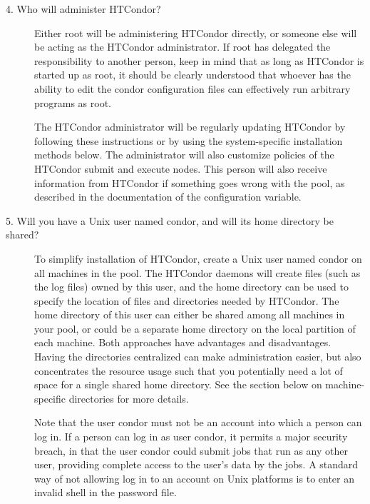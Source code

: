 \begin{description}
\item[4. Who will administer HTCondor?]



Either root will be administering HTCondor directly, or someone else
will be acting as the HTCondor administrator.  If root has delegated
the responsibility to another person, keep in mind that as long as
HTCondor is started up as root, it should be clearly understood that
whoever has the ability to edit the condor configuration files can
effectively run arbitrary programs as root.

The HTCondor administrator will be regularly updating HTCondor by following
these instructions or by using the system-specific installation methods below.
The administrator
will also customize policies of the HTCondor submit and execute nodes.
This person will also receive information from HTCondor if 
something goes wrong with the pool, 
as described in the documentation of the 
configuration variable.

\item[5. Will you have a Unix user named condor, and will its home
directory be shared?]

To simplify installation of HTCondor,
create a Unix user named condor on all machines in the pool.
The HTCondor daemons will create files
(such as the log files) owned by this user,
and the home directory can be used to specify the location of files
and directories needed by HTCondor.  The home directory of this user can
either be shared among all machines in your pool, or could be a
separate home directory on the local partition of each machine.  Both
approaches have advantages and disadvantages.  Having the directories
centralized can make administration easier, but also concentrates the
resource usage such that you potentially need a lot of space for a
single shared home directory.  See the section below on
machine-specific directories for more details.

Note that the user condor must not be an account into which a person
can log in.
If a person can log in as user condor, 
it permits a major security breach,
in that the user condor could submit jobs that run as any other user,
providing complete access to the user's data by the jobs. 
A standard way of not allowing log in to an account on Unix platforms
is to enter an invalid shell in the password file.


\end{description}
